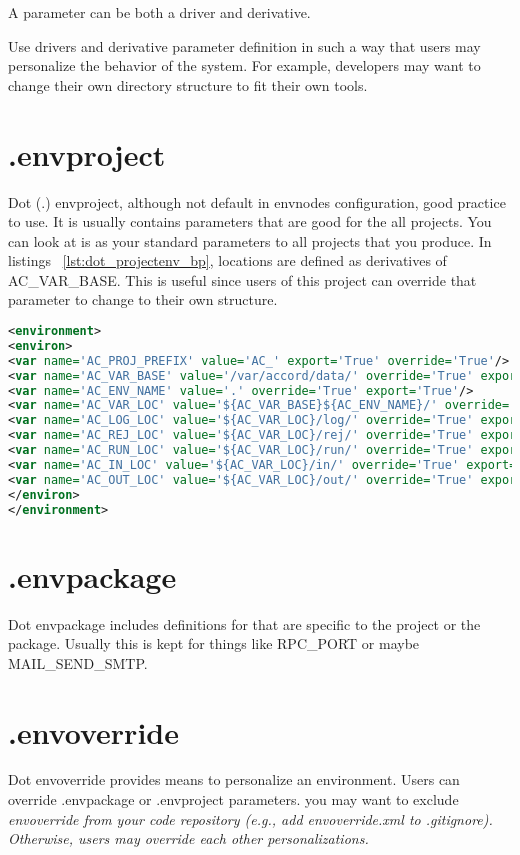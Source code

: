 \documentclass[design.tex]{subfiles}
\begin{document}
A parameter can be both a driver and derivative.

Use drivers and derivative parameter definition in such a way that users may personalize the behavior of the system.  For example, developers may want to change their own directory structure to fit their own tools.
 

\section{.envproject}
Dot (.) envproject, although not default in envnodes configuration, good practice to use.  It is usually contains parameters that are good for the all projects.  You can look at is as your standard parameters to all projects that you produce. In listings ~\ref{lst:dot_projectenv_bp}, locations are defined as derivatives of AC\_VAR\_BASE. This is useful since users of this project can override that parameter to change to their own structure.

\begin{lstlisting}[language=XML, label=lst:dot_envproject_bp, caption='.envproject.xml example']
<environment>
<environ>
<var name='AC_PROJ_PREFIX' value='AC_' export='True' override='True'/>
<var name='AC_VAR_BASE' value='/var/accord/data/' override='True' export='True'/>
<var name='AC_ENV_NAME' value='.' override='True' export='True'/>
<var name='AC_VAR_LOC' value='${AC_VAR_BASE}${AC_ENV_NAME}/' override='True' export='True'/>
<var name='AC_LOG_LOC' value='${AC_VAR_LOC}/log/' override='True' export='True'/>
<var name='AC_REJ_LOC' value='${AC_VAR_LOC}/rej/' override='True' export='True'/>
<var name='AC_RUN_LOC' value='${AC_VAR_LOC}/run/' override='True' export='True'/>
<var name='AC_IN_LOC' value='${AC_VAR_LOC}/in/' override='True' export='True'/>
<var name='AC_OUT_LOC' value='${AC_VAR_LOC}/out/' override='True' export='True'/>
</environ>
</environment>
\end{lstlisting}

\section{.envpackage}
Dot envpackage includes definitions for that are specific to the project or the package.  Usually this is kept for things like RPC\_PORT or maybe MAIL\_SEND\_SMTP. 

\section{.envoverride}
Dot envoverride provides means to personalize an environment.  Users can override .envpackage or .envproject parameters.
you may want to exclude \em{envoverride} from your code repository (e.g., add envoverride.xml to .gitignore).  Otherwise, users may override each other personalizations. 
\end{document}
